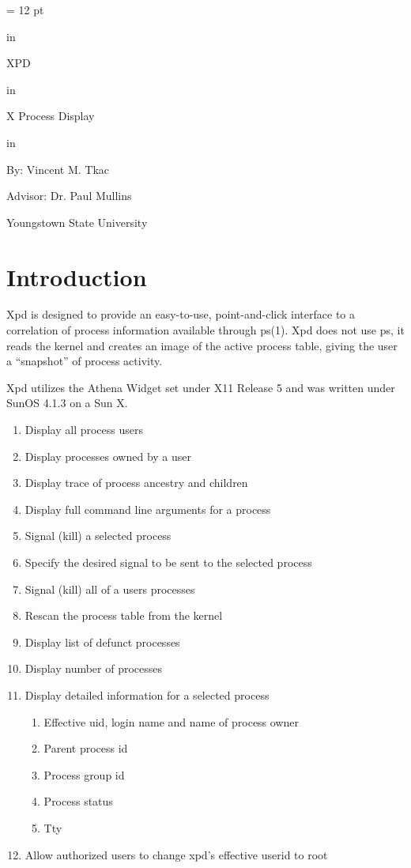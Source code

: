 \baselineskip = 12 pt

%





\thispagestyle{empty}

 in
\centerline{\Huge XPD }
 in
\centerline{\Large X Process Display }
 in
\centerline{By: Vincent M. Tkac}
\centerline{Advisor: Dr. Paul Mullins}
\bigskip
\centerline{Youngstown State University}
\vfill
{}

\newpage

\raggedbottom
{}
\tableofcontents
\listoffigures
\addtocounter{chapter}{-1}
\newpage
\pagestyle{headings}



\chapter{Introduction}
Xpd is designed to provide an easy-to-use, point-and-click interface to a correlation of process information available through ps(1).
Xpd does not use ps, it reads the kernel and creates an image of the active process table, giving the user a ``snapshot'' of process activity.

Xpd utilizes the Athena Widget set under X11 Release 5 and was written under SunOS 4.1.3 on a Sun X.

\medskip
\bigskip
{}
\begin{enumerate}
\item{Display all process users}
\item{Display processes owned by a user}
\item{Display trace of process ancestry and children}
\item{Display full command line arguments for a process}
\item{Signal (kill) a selected process}
\item{Specify the desired signal to be sent to the selected process}
\item{Signal (kill) all of a users processes}
\item{Rescan the process table from the kernel}
\item{Display list of defunct processes}
\item{Display number of processes}
\item{Display detailed information for a selected process}
\begin{enumerate}
\item{Effective uid, login name and name of process owner}
\item{Parent process id}
\item{Process group id}
\item{Process status}
\item{Tty}
\end{enumerate}
\item{Allow authorized users to change xpd's effective userid to root}
\end{enumerate}

